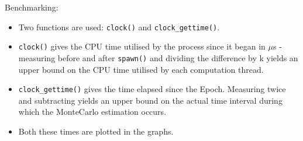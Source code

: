 \documentclass{amsart}           %
\begin{document}
    Benchmarking: 
    \begin{itemize}
        \item Two functions are used: \texttt{clock()} and \texttt{clock\_gettime()}. 
        \item \texttt{clock()} gives the CPU time utilised by the process since it began in $\mu$s - measuring before and after \texttt{spawn()}  and dividing the difference by k yields an upper bound on the CPU time utilised by each computation thread.
        \item \texttt{clock\_gettime()} gives the time elapsed since the Epoch. Measuring twice and subtracting yields an upper bound on the actual time interval during which the MonteCarlo estimation occurs.
        \item Both these times are plotted in the graphs.
    \end{itemize}
\end{document}

